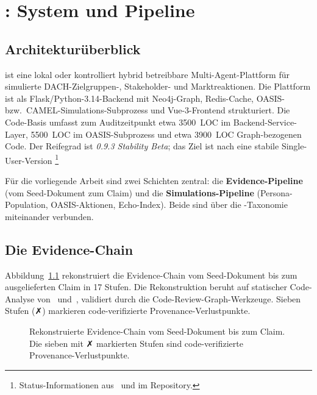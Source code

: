 
\chapter{\agora{}: System und Pipeline}\label{ch:system}

\section{Architekturüberblick}\label{sec:architektur}

\agora{} ist eine lokal oder kontrolliert hybrid betreibbare Multi-Agent-Plattform für simulierte DACH-Zielgruppen-, Stakeholder- und Marktreaktionen. Die Plattform ist als Flask/Python-3.14-Backend mit Neo4j-Graph, Redis-Cache, OASIS- bzw.\ CAMEL-Simulations-Subprozess und Vue-3-Frontend strukturiert. Die Code-Basis umfasst zum Auditzeitpunkt etwa 3500~LOC im Backend-Service-Layer, 5500~LOC im OASIS-Subprozess und etwa 3900~LOC Graph-bezogenen Code. Der Reifegrad ist \emph{0.9.3 Stability Beta}; das Ziel ist nach  eine stabile Single-User-Version \footnote{\raggedright Status-Informationen aus~ und  im Repository.}

Für die vorliegende Arbeit sind zwei Schichten zentral: die \textbf{Evidence-Pipeline} (vom Seed-Dokument zum Claim) und die \textbf{Simulations-Pipeline} (Persona-Population, OASIS-Aktionen, Echo-Index). Beide sind über die -Taxonomie~\cite{adr-0011} miteinander verbunden.

\section{Die Evidence-Chain}\label{sec:evidencechain}

Abbildung~\ref{fig:evidence-chain} rekonstruiert die Evidence-Chain vom Seed-Dokument bis zum ausgelieferten Claim in 17 Stufen. Die Rekonstruktion beruht auf statischer Code-Analyse von~ und~, validiert durch die Code-Review-Graph-Werkzeuge. Sieben Stufen (\textsc{✗}) markieren code-verifizierte Provenance-Verlustpunkte.

\begin{figure}[ht]
  \centering
  
  \caption{Rekonstruierte Evidence-Chain vom Seed-Dokument bis zum Claim. Die sieben mit \textsc{✗} markierten Stufen sind code-verifizierte Provenance-Verlustpunkte.}
  \label{fig:evidence-chain}
\end{figure}

